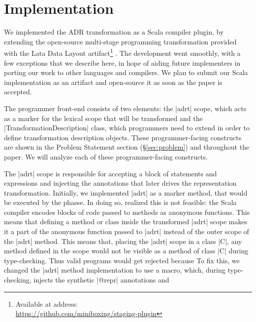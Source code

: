 \section{Implementation}
\label{sec:impl}

We implemented the ADR transformation as a Scala compiler plugin, by extending the open-source multi-stage programming transformation provided with the Lata Data Layout artifact\footnote{Available at address:\\ \url{https://github.com/miniboxing/staging-plugin}} \cite{ldl}. The development went smoothly, with a few exceptions that we describe here, in hope of aiding future implementers in porting our work to other languages and compilers. We plan to submit our Scala implementation as an artifact and open-source it as soon as the paper is accepted.

The programmer front-end consists of two elements: the |adrt| scope, which acts as a marker for the lexical scope that will be transformed and the |TransformationDescription| class, which programmers need to extend in order to define transformation description objects. These programmer-facing constructs are shown in the Problem Statement section (\S\ref{sec:problem}) and throughout the paper. We will analyze each of these programmer-facing constructs.

The |adrt| scope is responsible for accepting a block of statements and expressions and injecting the annotations that later drives the representation transformation. Initially, we implemented |adrt| as a marker method, that would be executed by the \inject{} phasse. In doing so, realized this is not feasible: the Scala compiler encodes blocks of code passed to methods as anonymous functions. This means that defining a method or class inside the transformed |adrt| scope makes it a part of the anonymous function passed to |adrt| instead of the outer scope of the |adrt| method. This means that, placing the |adrt| scope in a class |C|, any method defined in the scope would not be visible as a method of class |C| during type-checking. Thus valid programs would get rejected because  To fix this, we changed the |adrt| method implementation to use a macro, which, during type-checking, injects the synthetic |@repr| annotations and








